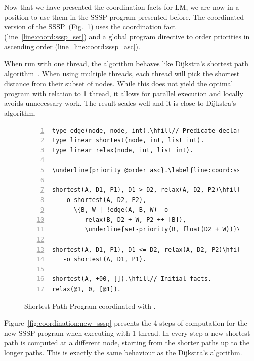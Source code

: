 Now that we have presented the coordination facts for LM, we are now in a
position to use them in the SSSP program presented before.  The coordinated
version of the SSSP~(Fig.~\ref{code:shortest_path_program_coord}) uses the
coordination fact  (line~\ref{line:coord:sssp_set}) and a
global program directive to order priorities in ascending order
(line~\ref{line:coord:sssp_asc}).

When run with one thread, the algorithm behaves like Dijkstra's shortest path
algorithm~\cite{Dijkstra}. When using multiple threads, each thread will pick
the shortest distance from their subset of nodes.  While this does not yield the
optimal program with relation to 1 thread, it allows for parallel execution and
locally avoids unnecessary work. The result scales well and it is close to
Dijkstra's algorithm.

\begin{figure}[ht]
\begin{Verbatim}[numbers=left,commandchars=\\\{\},fontsize=\scriptsize]
type edge(node, node, int).\hfill// Predicate declaration.
type linear shortest(node, int, list int).
type linear relax(node, int, list int).

\underline{priority @order asc}.\label{line:coord:sssp_asc}

shortest(A, D1, P1), D1 > D2, relax(A, D2, P2)\hfill// Rule 1: newly improved path.
   -o shortest(A, D2, P2),
      \{B, W | !edge(A, B, W) -o
         relax(B, D2 + W, P2 ++ [B]),
         \underline{set-priority(B, float(D2 + W))}\}.\label{line:coord:sssp_set}

shortest(A, D1, P1), D1 <= D2, relax(A, D2, P2)\hfill// Rule 2: longer path.
   -o shortest(A, D1, P1).

shortest(A, +00, []).\hfill// Initial facts.
relax(@1, 0, [@1]).
\end{Verbatim}
   \caption{Shortest Path Program coordinated with .}
   \label{code:shortest_path_program_coord}
\end{figure}

Figure~\ref{fig:coordination:new_sssp} presents the 4 steps of computation for
the new SSSP program when executing with 1 thread. In every step a new shortest
path is computed at a different node, starting from the shorter paths up to
the longer paths. This is exactly the same behaviour as the Dijkstra's
algorithm.

